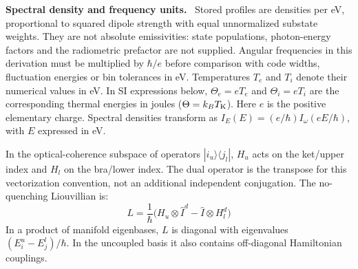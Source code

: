 \documentclass[11pt,a4paper]{article}
\newenvironment{implnote}[1][Implementation]{%
  \par\smallskip\noindent\begin{lrbox}{\notebox}\setlength{\fboxsep}{6pt}\begin{minipage}{\dimexpr\linewidth-2\fboxsep-2\fboxrule\relax}\small\textbf{#1.}\ }{%
  \end{minipage}\end{lrbox}\setlength{\fboxsep}{6pt}\fcolorbox{noteframe}{notebg}{\usebox{\notebox}}\par\smallskip}
\numberwithin{equation}{section}
\begin{document}
\begin{implnote}[Spectral density and frequency units]
Stored profiles are densities per eV, proportional to squared dipole strength
with equal unnormalized substate weights. They are not absolute emissivities:
state populations, photon-energy factors and the radiometric prefactor are not supplied.
Angular frequencies in this derivation must be multiplied by $\hbar/e$ before
comparison with code widths, fluctuation energies or bin tolerances in eV.
Temperatures $T_e$ and $T_i$ denote their numerical values in eV. In SI
expressions below, $\Theta_e=eT_e$ and $\Theta_i=eT_i$ are the corresponding
thermal energies in joules ($\Theta=k_BT_{\rm K}$). Here $e$ is the positive
elementary charge. Spectral densities transform as
$I_E(E)=(e/\hbar)I_\omega(eE/\hbar)$, with $E$ expressed in eV.
\end{implnote}

In the optical-coherence subspace of operators $|i_u\rangle\langle j_l|$, $H_u$ acts on the ket/upper index and $H_l$ on the bra/lower index. The dual operator is the transpose for this vectorization convention, not an additional independent conjugation. The no-quenching Liouvillian is:
\begin{equation}
\label{eq:liouvillian}
L = \frac{1}{\hbar} \bigl(H_u \otimes \hat{I}^d - \hat{I} \otimes H_l^d\bigr)
\end{equation}
In a product of manifold eigenbases, $L$ is diagonal with eigenvalues $(E_i^u-E_j^l)/\hbar$. In the uncoupled basis it also contains off-diagonal Hamiltonian couplings.
\end{document}
